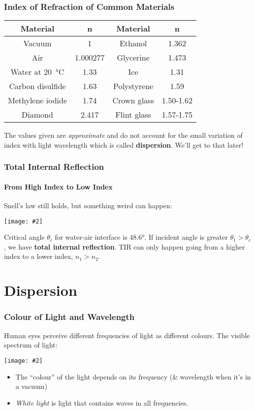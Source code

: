 \documentclass[compress,aspectratio=169]{beamer}
\newcommand{\pic}[2]{\texttt{[image: \#2]}}
\begin{document}
\begin{frame}
  \frametitle{Index of Refraction of Common Materials}
  \begin{center}
    \begin{tabular}{c|c||c|c}
      \rowcolor{pink}
      \textbf{Material} & \textbf{n} & \textbf{Material} & \textbf{n}\\ \hline
      Vacuum           & 1        & Ethanol     & 1.362 \\
      Air              & 1.000277 & Glycerine   & 1.473 \\
      Water at \SI{20}{\celsius} & 1.33 & Ice         & 1.31 \\
      Carbon disulfide & 1.63     & Polystyrene & 1.59 \\
      Methylene iodide & 1.74     & Crown glass & 1.50-1.62\\
      Diamond          & 2.417    & Flint glass & 1.57-1.75\\
    \end{tabular}
  \end{center}
  
  \vspace{.2in}
  The values given are \emph{approximate} and do not account for the small
  variation of index with light wavelength which is called
  \textbf{dispersion}. We'll get to that later!
\end{frame}

\begin{frame}
  \frametitle{Total Internal Reflection}
  \framesubtitle{From High Index to Low Index}
  Snell's law still holds, but something weird can happen:
  \begin{center}
    \pic{.8}{660px-RefractionReflextion.png}
  \end{center}
  Critical angle $\theta_c$ for water-air interface is \ang{48.6}. If
  incident angle is greater $\theta_1>\theta_c$, we have
  \textbf{total internal reflection}. TIR can only happen going from a higher
  index to a lower index, $n_1>n_2$.
\end{frame}

\section{Dispersion}

\begin{frame}
  \frametitle{Colour of Light and Wavelength}
  Human eyes perceive different frequencies of light as different colours.
  The visible spectrum of light:
  \begin{center}
    \pic{.45}{visiblespectrum.png}
  \end{center}
  \begin{itemize}
  \item The ``colour'' of the light depends on its frequency (\& wavelength
    when it's in a vacuum)
  \item \emph{White light} is light that contains waves in all frequencies.
  \end{itemize}
\end{frame}
\end{document}
